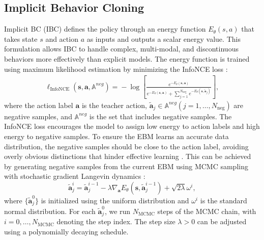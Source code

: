 \subsection{Implicit Behavior Cloning}

Implicit BC (IBC) \cite{2022_implicit_BC} defines the policy through an energy function \( E_\theta(s, a) \) that takes state \( s \) and action \( a \) as inputs and outputs a scalar energy value. 
This formulation allows IBC to handle complex, multi-modal, and discontinuous behaviors more effectively than explicit models.
The energy function is trained using maximum likelihood estimation by minimizing the InfoNCE loss \cite{2018_InfoNCE_representation_learning, 2024_revisting_IBC}:
\begin{align}
\label{eq:ibc_info_NCE}
\ell_{\text{InfoNCE}}(\bm s, \bm a, \mathbb{A}^{neg})
\!\! = \!\! - \! \log \! \left[ \! \frac{e^{-E_\theta(\bm s, \bm a)}}{e^{-\!E_\theta(\bm s, \bm a)} \!\! + \!\!\sum_{j=1}^{N_{\text{neg}}} e^{-\!E_\theta(\bm s, \tilde{\bm a}_j)}} \!\right] \!\!,\!\!
\end{align}
where the action label \(\bm a\) is the teacher action,  \(\tilde{\bm a}_j \in \mathbb{A}^{neg} (j = 1, \dots, N_{\text{neg}}) \) are negative samples, and $ \mathbb{A}^{neg}$ is the set that includes negative samples. 
The InfoNCE loss encourages the model to assign low energy to action labels and high energy to negative samples. 
To ensure the EBM learns an accurate data distribution, the negative samples should be close to the action label, avoiding overly obvious distinctions that hinder effective learning \cite{2020_flow_constrastive_estimation_EBM}. 
This can be achieved by generating negative samples from the current EBM using MCMC sampling with stochastic gradient Langevin dynamics \cite{2011_Langevin_dynamics, 2019_EBM_Du_Yilun}:
\begin{equation}
\tilde{\bm a}_j^i = \tilde{\bm a}_j^{i-1} - \lambda \nabla_{\bm a} E_\theta(\bm s, \tilde{\bm a}_j^{i-1}) + \sqrt{2\lambda}   \omega^i,    
\label{eq:mcmc_sampling}
\end{equation}
where $\{ \tilde{\bm a}_j^0 \}$ is initialized using the uniform distribution and $\omega^i$ is the standard normal distribution.
For each $\tilde{\bm a}_j^0 $, we run $N_{\text{MCMC}}$ steps of the MCMC chain, with $i = 0, \dots, N_{\text{MCMC}}$ denoting the step index. The step size $\lambda > 0$ can be adjusted using a polynomially decaying schedule.

